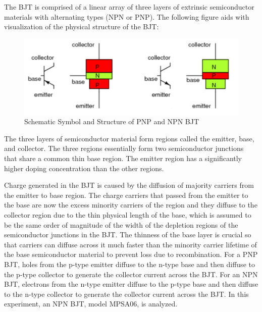 The BJT is comprised of a linear array of three layers of extrinsic semiconductor materials with alternating types (NPN or PNP). The following figure aids with visualization of the physical structure of the BJT:

\FloatBarrier

\begin{figure}[h!]
	\centering
	\includegraphics[scale=0.75]{../images/bjt_fig.PNG}
	\caption{Schematic Symbol and Structure of PNP and NPN BJT}
	\label{fig:id_vs_vgs}
\end{figure}

\FloatBarrier

The three layers of semiconductor material form regions called the emitter, base, and collector. The three regions essentially form two semiconductor junctions that share a common thin base region. The emitter region has a significantly higher doping concentration than the other regions. 

Charge generated in the BJT is caused by the diffusion of majority carriers from the emitter to base region. The charge carriers that passed from the emitter to the base are now the excess minority carriers of the region and they diffuse to the collector region due to the thin physical length of the base, which is assumed to be the same order of magnitude of the width of the depletion regions of the semiconductor junctions in the BJT. The thinness of the base layer is crucial so that carriers can diffuse across it much faster than the minority carrier lifetime of the base semiconductor material to prevent loss due to recombination. For a PNP BJT, holes from the p-type emitter diffuse to the n-type base and then diffuse to the p-type collector to generate the collector current across the BJT. For an NPN BJT, electrons from the n-type emitter diffuse to the p-type base and then diffuse to the n-type collector to generate the collector current across the BJT.  In this experiment, an NPN BJT, model MPSA06, is analyzed.

